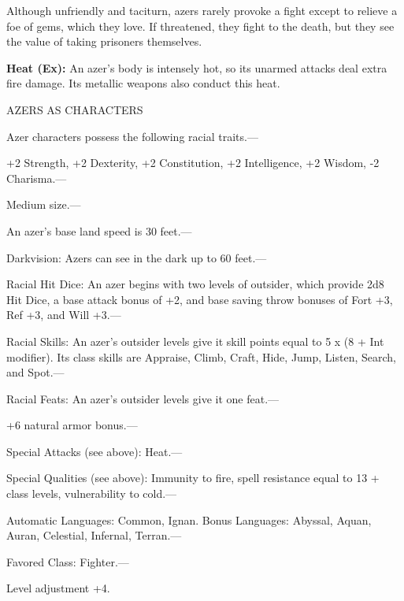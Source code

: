 \documentclass{article}
\begin{document}
Although unfriendly and taciturn, azers rarely provoke a fight except to relieve 
a foe of gems, which they love. If threatened, they fight to the death, but they 
see the value of taking prisoners themselves.

\textbf{Heat (Ex):} An azer's body is intensely hot, so its unarmed attacks deal 
extra fire damage. Its metallic weapons also conduct this heat.

\vspace{12pt}
AZERS AS CHARACTERS

Azer characters possess the following racial traits.--- 

\parindent=3pt
+2 Strength, +2 Dexterity, +2 Constitution, +2 Intelligence, +2 Wisdom, -2 Charisma.---

\parindent=0pt
Medium size.---

An azer's base land speed is 30 feet.---

Darkvision: Azers can see in the dark up to 60 feet.---

Racial Hit Dice: An azer begins with two levels of outsider, which provide 2d8 
Hit Dice, a base attack bonus of +2, and base saving throw bonuses of Fort +3, 
Ref +3, and Will +3.---

Racial Skills: An azer's outsider levels give it skill points equal to 5 x (8 + 
Int modifier). Its class skills are Appraise, Climb, Craft, Hide, Jump, Listen, 
Search, and Spot.---

Racial Feats: An azer's outsider levels give it one feat.--- 

\parindent=3pt
+6 natural armor bonus.---

\parindent=0pt
Special Attacks (see above): Heat.---

Special Qualities (see above): Immunity to fire, spell resistance equal to 13 + 
class levels, vulnerability to cold.---

Automatic Languages: Common, Ignan. Bonus Languages: Abyssal, Aquan, Auran, Celestial, 
Infernal, Terran.---

Favored Class: Fighter.---

Level adjustment +4.

\newpage
\end{document}
